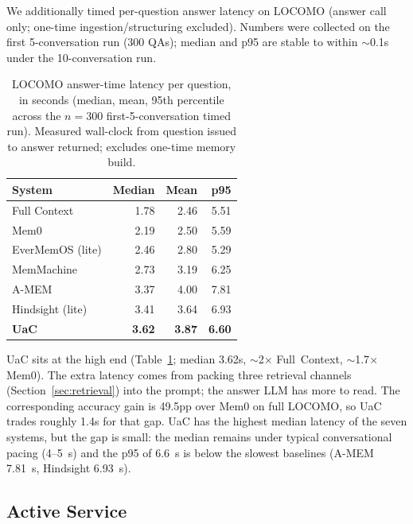 We additionally timed per-question answer latency on LOCOMO (answer call only; one-time ingestion/structuring excluded). Numbers were collected on the first 5-conversation run (300 QAs); median and p95 are stable to within $\sim$0.1s under the 10-conversation run.

\begin{table}[!ht]
\centering
\caption{LOCOMO answer-time latency per question, in seconds (median, mean, 95th percentile across the $n{=}300$ first-5-conversation timed run). Measured wall-clock from question issued to answer returned; excludes one-time memory build.}
\label{tab:latency}
\small
\begin{tabular}{@{}lrrr@{}}
\toprule
\textbf{System} & \textbf{Median} & \textbf{Mean} & \textbf{p95} \\
\midrule
Full Context  & 1.78 & 2.46 & 5.51 \\
Mem0          & 2.19 & 2.50 & 5.59 \\
EverMemOS (lite) & 2.46 & 2.80 & 5.29 \\
MemMachine    & 2.73 & 3.19 & 6.25 \\
A-MEM         & 3.37 & 4.00 & 7.81 \\
Hindsight (lite) & 3.41 & 3.64 & 6.93 \\
\textbf{UaC}        & \textbf{3.62} & \textbf{3.87} & \textbf{6.60} \\
\bottomrule
\end{tabular}
\end{table}

UaC sits at the high end (Table~\ref{tab:latency}; median 3.62s, $\sim$2$\times$ Full~Context, $\sim$1.7$\times$ Mem0). The extra latency comes from packing three retrieval channels (Section~\ref{sec:retrieval}) into the prompt; the answer LLM has more to read. The corresponding accuracy gain is 49.5pp over Mem0 on full LOCOMO, so UaC trades roughly 1.4s for that gap. UaC has the highest median latency of the seven systems, but the gap is small: the median remains under typical conversational pacing (4--5~s) and the p95 of 6.6~s is below the slowest baselines (A-MEM 7.81~s, Hindsight 6.93~s).

\subsection{Active Service}
\label{sec:active-service}

